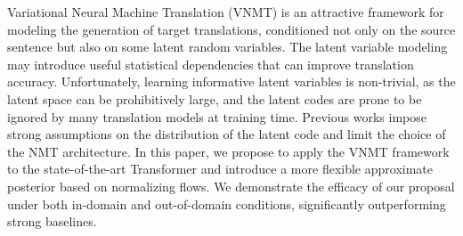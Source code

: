 Variational Neural Machine Translation (VNMT) is an attractive framework for modeling the generation of target translations, conditioned not only on the source sentence but also on some latent random variables. The latent variable modeling may introduce useful statistical dependencies that can improve translation accuracy. Unfortunately, learning informative latent variables is non-trivial, as the latent space can be prohibitively large, and the latent codes are prone to be ignored by many translation models at training time. Previous works impose strong assumptions on the distribution of the latent code and limit the choice of the NMT architecture. In this paper, we propose to apply the VNMT framework  to the state-of-the-art Transformer and introduce a more flexible approximate posterior based on normalizing flows. We demonstrate the efficacy of our proposal under both in-domain and out-of-domain conditions, significantly outperforming strong baselines.
